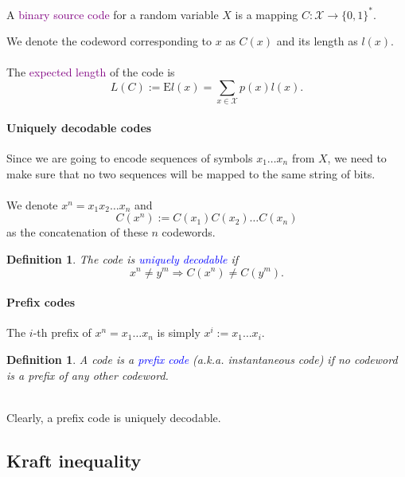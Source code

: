 \documentclass[a4paper, 11pt, openany]{book}
\numberwithin{equation}{section}
\theoremstyle{plain}
\newtheorem{definition}	[equation]	{Definition}
\theoremstyle{definition}
\newcommand{\Structure}[1]{\textcolor{blue}{#1}}
\newcommand{\Define}[1]{\textcolor{purple}{#1}}
\newcommand{\alphabet}[1]{\mathcal{#1}}
\begin{document}
A \Define{binary source code} for a random variable $X$ is a mapping $C : \alphabet{X} \to \{0,1\}^*$.

We denote the codeword corresponding to $x$ as $C(x)$ and its length as $l(x)$.\\
~\\
The \Define{expected length} of the code is
\[
	L(C) := \mathrm{E} l(x) = \sum_{x \in \alphabet{X}} p(x) l(x).
\]




\paragraph{Uniquely decodable codes}

Since we are going to encode  sequences of symbols $x_1 \ldots x_n$ from $X$, we need to make sure that no two sequences will be mapped to the same string of bits.\\
~\\
We denote $x^n = x_1 x_2 \ldots x_n$ and
$$
	C(x^n) := C(x_1) C(x_2) \ldots C(x_n)
$$
as the concatenation of these $n$ codewords.

\begin{definition}
The code is \Structure{uniquely decodable} if
$$
	x^n \ne y^m \Rightarrow C(x^n) \ne C(y^m).
$$
\end{definition}




\paragraph{Prefix codes}

The $i$-th prefix of $x^n = x_1 \ldots x_n$ is simply $x^i := x_1 \ldots x_i$.

\begin{definition}
A code is a \Structure{prefix code} (a.k.a. instantaneous code) if no codeword is a prefix of any other codeword.
\end{definition}
~\\
Clearly, a prefix code is uniquely decodable.








\subsection{Kraft inequality}
\end{document}
